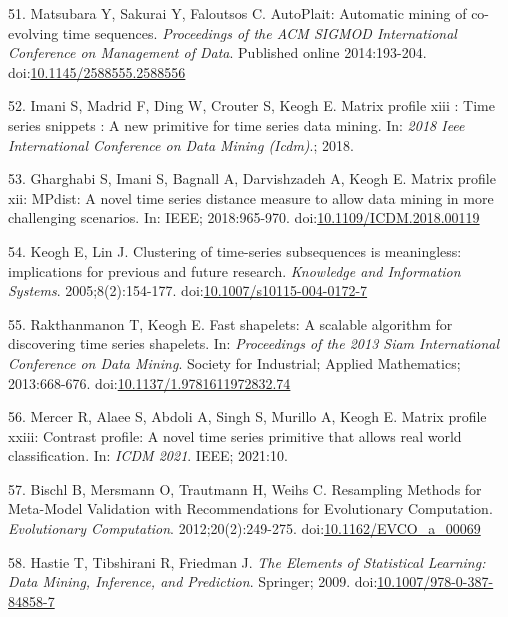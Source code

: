 \documentclass[12pt,twoside]{fmupthesis}
\begin{document}
\leavevmode\hypertarget{ref-Matsubara2014}{}%
51. Matsubara Y, Sakurai Y, Faloutsos C. AutoPlait: Automatic mining of co-evolving time sequences. \emph{Proceedings of the ACM SIGMOD International Conference on Management of Data}. Published online 2014:193-204. doi:\href{https://doi.org/10.1145/2588555.2588556}{10.1145/2588555.2588556}

\leavevmode\hypertarget{ref-Imani2018}{}%
52. Imani S, Madrid F, Ding W, Crouter S, Keogh E. Matrix profile xiii : Time series snippets : A new primitive for time series data mining. In: \emph{2018 Ieee International Conference on Data Mining (Icdm)}.; 2018.

\leavevmode\hypertarget{ref-gharghabi2018b}{}%
53. Gharghabi S, Imani S, Bagnall A, Darvishzadeh A, Keogh E. Matrix profile xii: MPdist: A novel time series distance measure to allow data mining in more challenging scenarios. In: IEEE; 2018:965-970. doi:\href{https://doi.org/10.1109/ICDM.2018.00119}{10.1109/ICDM.2018.00119}

\leavevmode\hypertarget{ref-Keogh2005}{}%
54. Keogh E, Lin J. Clustering of time-series subsequences is meaningless: implications for previous and future research. \emph{Knowledge and Information Systems}. 2005;8(2):154-177. doi:\href{https://doi.org/10.1007/s10115-004-0172-7}{10.1007/s10115-004-0172-7}

\leavevmode\hypertarget{ref-Rakthanmanon2013}{}%
55. Rakthanmanon T, Keogh E. Fast shapelets: A scalable algorithm for discovering time series shapelets. In: \emph{Proceedings of the 2013 Siam International Conference on Data Mining}. Society for Industrial; Applied Mathematics; 2013:668-676. doi:\href{https://doi.org/10.1137/1.9781611972832.74}{10.1137/1.9781611972832.74}

\leavevmode\hypertarget{ref-Mercer2021}{}%
56. Mercer R, Alaee S, Abdoli A, Singh S, Murillo A, Keogh E. Matrix profile xxiii: Contrast profile: A novel time series primitive that allows real world classification. In: \emph{ICDM 2021}. IEEE; 2021:10.

\leavevmode\hypertarget{ref-Bischl2012}{}%
57. Bischl B, Mersmann O, Trautmann H, Weihs C. Resampling Methods for Meta-Model Validation with Recommendations for Evolutionary Computation. \emph{Evolutionary Computation}. 2012;20(2):249-275. doi:\href{https://doi.org/10.1162/EVCO_a_00069}{10.1162/EVCO\_a\_00069}

\leavevmode\hypertarget{ref-Hastie2009}{}%
58. Hastie T, Tibshirani R, Friedman J. \emph{The Elements of Statistical Learning: Data Mining, Inference, and Prediction}. Springer; 2009. doi:\href{https://doi.org/10.1007/978-0-387-84858-7}{10.1007/978-0-387-84858-7}
\end{document}
